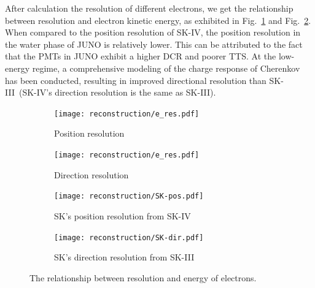 After calculation the resolution of different electrons, we get the relationship between resolution and electron kinetic energy, as exhibited in Fig.~\ref{fig:res_pos} and Fig.~\ref{fig:dir_pos}. When compared to the position resolution of SK-IV, the position resolution in the water phase of JUNO is relatively lower. This can be attributed to the fact that the PMTs in JUNO exhibit a higher DCR and poorer TTS. At the low-energy regime, a comprehensive modeling of the charge response of Cherenkov has been conducted, resulting in improved directional resolution than SK-III~(SK-IV's direction resolution is the same as SK-III).
\begin{figure}[h]
	\begin{subfigure}{0.5\textwidth}
		\centering
		{\texttt{[image: reconstruction/e\_res.pdf]}}
		\caption{Position resolution}
		\label{fig:res_pos}
	\end{subfigure}%
	\hfill
	\begin{subfigure}{0.5\textwidth}
		\centering
		{\texttt{[image: reconstruction/e\_res.pdf]}}
		\caption{Direction resolution}
		\label{fig:dir_pos}
	\end{subfigure}%
	\hfill
	\begin{subfigure}{0.5\textwidth}
		\centering
		{\texttt{[image: reconstruction/SK-pos.pdf]}}
		\caption{SK's position resolution from SK-IV~\cite{SK4}}
		\label{fig:SKres_pos}
	\end{subfigure}%
	\hfill
	\begin{subfigure}{0.5\textwidth}
		\centering
		{\texttt{[image: reconstruction/SK-dir.pdf]}}
		\caption{SK's direction resolution from SK-III~\cite{SK3}}
		\label{fig:SKdir_pos}
	\end{subfigure}%
	\caption{The relationship between resolution and energy of electrons.}
\end{figure}

